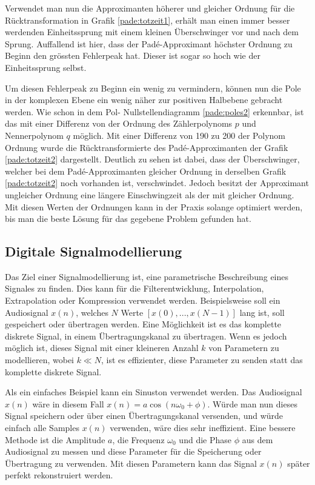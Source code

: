 Verwendet man nun die Approximanten höherer und gleicher Ordnung
für die Rücktransformation in Grafik \ref{pade:totzeit1}, erhält
man einen immer besser werdenden Einheitssprung mit einem kleinen
Überschwinger vor und nach dem Sprung.
Auffallend ist hier, dass der Padé-Approximant höchster Ordnung zu
Beginn den grössten Fehlerpeak hat.
Dieser ist sogar so hoch wie der Einheitssprung selbst.
%

Um diesen Fehlerpeak zu Beginn ein wenig zu vermindern, können nun die Pole in der komplexen Ebene ein wenig näher zur positiven Halbebene gebracht werden.
Wie schon in  dem Pol- Nullstellendiagramm \ref{pade:poles2} erkennbar, ist das mit einer Differenz von der Ordnung des Zählerpolynoms $p$ und Nennerpolynom $q$ möglich.
Mit einer Differenz von 190 zu 200 der Polynom Ordnung wurde die Rücktransformierte des Padé-Approximanten der Grafik \ref{pade:totzeit2} dargestellt.
Deutlich zu sehen ist dabei, dass der Überschwinger, welcher bei dem Padé-Approximanten gleicher Ordnung in derselben Grafik \ref{pade:totzeit2} noch vorhanden ist, verschwindet.
Jedoch besitzt der Approximant ungleicher Ordnung eine längere Einschwingzeit als der mit gleicher Ordnung. 
Mit diesen Werten der Ordnungen kann in der Praxis solange optimiert werden, bis man die beste Lösung für das gegebene Problem gefunden hat.

\FloatBarrier

\subsection{Digitale Signalmodellierung
	\label{pade:subsection:SignalMod}}

Das Ziel einer Signalmodellierung ist, eine parametrische Beschreibung eines Signales zu finden.
%
%
Dies kann für die Filterentwicklung, Interpolation, Extrapolation oder Kompression verwendet werden.
%
%
%
%
Beispielsweise soll ein Audiosignal $x(n)$, welches $N$ Werte
$[x(0),...,x(N-1)]$
lang ist,
soll gespeichert oder übertragen werden.
%
Eine Möglichkeit ist es das komplette diskrete Signal, in einem Übertragungskanal zu übertragen.
Wenn es jedoch möglich ist, dieses Signal mit einer kleineren Anzahl
$k$ von Parametern zu modellieren, wobei $k\ll N$, ist es effizienter,
diese Parameter zu senden statt das komplette diskrete Signal.

Als ein einfaches Beispiel kann ein Sinuston verwendet werden.
Das Audiosignal $x(n)$ wäre in diesem Fall $x(n)= a \cos(n\omega_0 + \phi)$.
Würde man nun dieses Signal speichern oder über einen Übertragungskanal versenden, und würde einfach alle Samples $x(n)$ verwenden, wäre dies sehr ineffizient.
Eine bessere Methode ist die Amplitude $a$, die Frequenz $\omega_0$ und die Phase $\phi$ aus dem Audiosignal zu messen und diese Parameter für die Speicherung oder Übertragung zu verwenden.
Mit diesen Parametern kann das Signal $x(n)$ später perfekt rekonstruiert werden.


